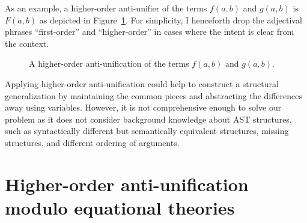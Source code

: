 As an example, a higher-order anti-unifier of the terms $f(a,b)$ and $g(a,b)$ is $F(a,b)$ as depicted in Figure~\ref{fig:higher-anti-uni}.   For simplicity, I henceforth drop the adjectival phrases ``first-order'' and ``higher-order'' in cases where the intent is clear from the context.

\begin{figure}[t]
\centering{}
\caption{A higher-order anti-unification of the terms $f(a,b)$ and $g(a,b)$.\label{fig:higher-anti-uni}}
\end{figure}

Applying higher-order anti-unification could help to construct a structural generalization by maintaining the common pieces and abstracting the differences away using variables. However, it is not comprehensive enough to solve our problem as it does not consider background knowledge about AST structures, such as syntactically different but semantically equivalent structures, missing structures, and different ordering of arguments.

\section{Higher-order anti-unification modulo equational theories}\label{HOAUMT}

